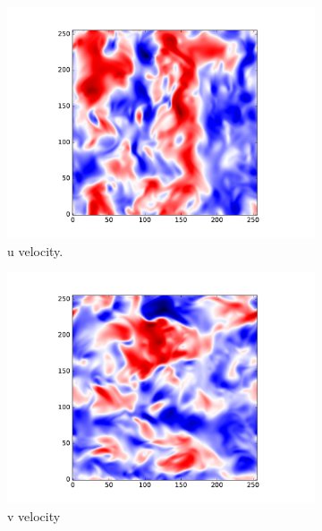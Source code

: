 \documentclass[12pt, a4paper, openany]{memoir}
\begin{document}
\begin{figure}[h!]
	\centering
	\begin{subfigure}[b]{0.45\textwidth}
		\centering
		\includegraphics[trim=80 20 80 20 ,clip,width=\textwidth]{figure/dns_u.pdf}
		\caption{u velocity.}
	\end{subfigure}
	\begin{subfigure}[b]{0.45\textwidth}
		\centering
		\includegraphics[trim=80 20 80 20 ,clip,width=\textwidth]{figure/dns_v.pdf}
		\caption{v velocity}
	\end{subfigure}
	\begin{subfigure}[b]{0.45\textwidth}
		\centering

\end{subfigure}
\end{figure}
\end{document}
